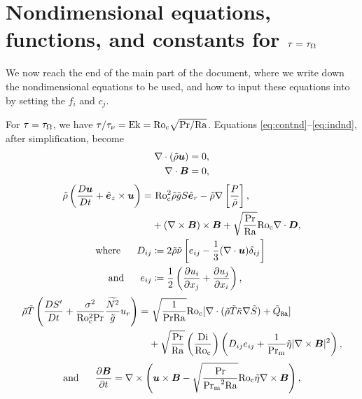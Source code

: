 \documentclass[12pt]{article}
\numberwithin{equation}{section}
\begin{document}
\section{Nondimensional equations, functions, and constants for $\tau=\tau_\Omega$}\label{sec:eqndrot}
We now reach the end of the main part of the document, where we write down the nondimensional equations to be used, and how to input these equations into {\rayleigh} by setting the $f_i$ and $c_j$. 

For $\tau=\tau_\Omega$, we have $\tau/\tau_{\nu}={\rm{Ek}}={\rm{Ro_c}}\sqrt{{\rm{Pr}}/{\rm{Ra}}}$. Equations \eqref{eq:contnd}--\eqref{eq:indnd}, after simplification, become
\begin{align}
	\nabla\cdot(\tilde{\rho}\bm{u}) &= 0\label{eq:contndrot},\\
	\nabla\cdot \bm{B} &= 0,
\end{align}
\begin{subequations}\label{eq:momndrot}
	\begin{align}
		\rhotilde\left(\matderiv{\vecu} + \ez\times\vecu\right) = &\ \rocsq \rhotilde\gtilde S\er         -\rhotilde\nabla\left[ \frac{P}{\rhotilde} \right], \nonumber\\
		&+(\curl\vecb)\times\vecb + \sqrt{\frac{\pr}{\ra}}\roc \Div\bm{D},\\
		\where D_{ij} &\define 2\rhotilde\nutilde \left[e_{ij} - \frac{1}{3}(\Div\vecu) \delta_{ij} \right]\\
		\andd e_{ij} &\define \frac{1}{2}\left(\pderiv{u_i}{x_j} + \pderiv{u_j}{x_i} \right),
	\end{align}
\end{subequations}
\begin{align}\label{eq:enndrot}
	\tilde{\rho}\tilde{T}\left( \frac{D{S^\prime}}{Dt}+ \frac{\sigma^2}{{\rm{Ro_c^2}}{\rm{Pr}}} \frac{\widetilde{N^2}}{\tilde{g}} u_r\right)  = &\ \sqrt{\frac{1}{{\rm{Pr}}{\rm{Ra}}}}{\rm{Ro_c}} [\nabla\cdot(\tilde{\rho} \tilde{T} \tilde{\kappa} \nabla \tilde{S}) + \tilde{Q}_{\texttt{Ra}}] \nonumber \\
	&+ \sqrt{\frac{{\rm{Pr}}}{{\rm{Ra}}}}\left(\frac{{\rm{Di}}}{{\rm{Ro_c}}}\right) \left( D_{ij}e_{ij} + \frac{1}{{\rm{Pr_m}}} \tilde{\eta}|\nabla\times\bm{B}|^2\right),
\end{align}
\begin{align}\label{eq:indndrot}
	\text{and}\ \ \ \ \  \frac{\partial\bm{B}}{\partial t} = \nabla\times\left(\bm{u}\times\bm{B} - \sqrt{\frac{{\rm{Pr}}}{{\rm{Pr_m}}^2{\rm{Ra}}}}{\rm{Ro_c}} \tilde{\eta}\nabla\times\bm{B}\right),
\end{align}	
\end{document}
